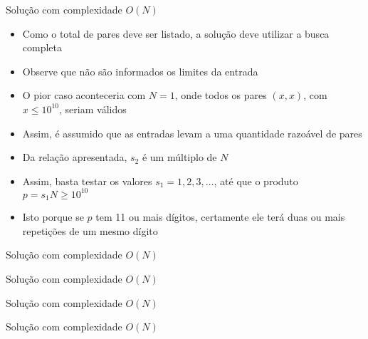 \begin{frame}[fragile]{Solução com complexidade $O(N)$}

    \begin{itemize}
        \item Como o total de pares deve ser listado, a solução deve utilizar a busca completa

        \item Observe que não são informados os limites da entrada

        \item O pior caso aconteceria com $N = 1$, onde todos os pares $(x, x)$, com $x \leq 
            10^{10}$, seriam válidos

        \item Assim, é assumido que as entradas levam a uma quantidade razoável de pares

        \item Da relação apresentada, $s_2$ é um múltiplo de $N$

        \item Assim, basta testar os valores $s_1 = 1, 2, 3, \ldots$, até que o produto
            $p = s_1N \geq 10^{10}$

        \item Isto porque se $p$ tem 11 ou mais dígitos, certamente ele terá duas ou mais repetições
            de um mesmo dígito
   \end{itemize}

\end{frame}

\begin{frame}[fragile]{Solução com complexidade $O(N)$}
\end{frame}

\begin{frame}[fragile]{Solução com complexidade $O(N)$}
\end{frame}
\begin{frame}[fragile]{Solução com complexidade $O(N)$}
\end{frame}
\begin{frame}[fragile]{Solução com complexidade $O(N)$}
\end{frame}

